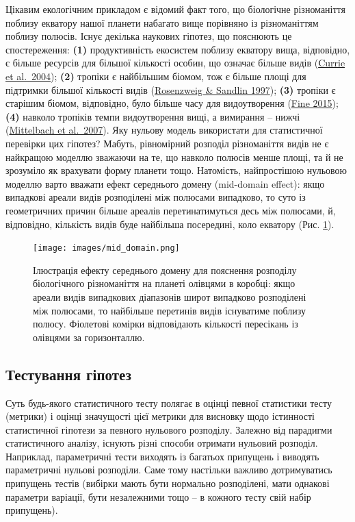 \documentclass[
  11pt,
]{book}
\begin{document}
Цікавим екологічним прикладом є відомий факт того, що біологічне різноманіття поблизу екватору нашої планети набагато вище порівняно із різноманіттям поблизу полюсів. Існує декілька наукових гіпотез, що пояснюють це спостереження: \textbf{(1)} продуктивність екосистем поблизу екватору вища, відповідно, є більше ресурсів для більшої кількості особин, що означає більше видів (\href{https://doi.org/10.1111/j.1461-0248.2004.00671.x}{Currie et al.~2004}); \textbf{(2)} тропіки є найбільшим біомом, тож є більше площі для підтримки більшої кількості видів (\href{https://doi.org/10.2307/3546528}{Rosenzweig \& Sandlin 1997}); \textbf{(3)} тропіки є старішим біомом, відповідно, було більше часу для видоутворення (\href{https://doi.org/10.1146/annurev-ecolsys-112414-054102}{Fine 2015}); \textbf{(4)} навколо тропіків темпи видоутворення вищі, а вимирання -- нижчі (\href{https://doi.org/10.1111/j.1461-0248.2007.01020.x}{Mittelbach et al.~2007}). Яку нульову модель використати для статистичної перевірки цих гіпотез? Мабуть, рівномірний розподіл різноманіття видів не є найкращою моделлю зважаючи на те, що навколо полюсів менше площі, та й не зрозуміло як врахувати форму планети тощо. Натомість, найпростішою нульовою моделлю варто вважати ефект середнього домену (mid-domain effect): якщо випадкові ареали видів розподілені між полюсами випадково, то суто із геометричних причин більше ареалів перетинатимуться десь між полюсами, й, відповідно, кількість видів буде найбільша посередині, коло екватору (Рис. \ref{fig:fig-3-11}).

\begin{figure}
\centering
\texttt{[image: images/mid\_domain.png]}
\caption{\label{fig:fig-3-11}Ілюстрація ефекту середнього домену для пояснення розподілу біологічного різноманіття на планеті олівцями в коробці: якщо ареали видів випадкових діапазонів широт випадково розподілені між полюсами, то найбільше перетинів видів існуватиме поблизу полюсу. Фіолетові комірки відповідають кількості пересікань із олівцями за горизонталлю.}
\end{figure}

\subsection{Тестування гіпотез}\label{pval}

Суть будь-якого статистичного тесту полягає в оцінці певної статистики тесту (метрики) і оцінці значущості цієї метрики для висновку щодо істинності статистичної гіпотези за певного нульового розподілу. Залежно від парадигми статистичного аналізу, існують різні способи отримати нульовий розподіл. Наприклад, параметричні тести виходять із багатьох припущень і виводять параметричні нульові розподіли. Саме тому настільки важливо дотримуватись припущень тестів (вибірки мають бути нормально розподілені, мати однакові параметри варіації, бути незалежними тощо -- в кожного тесту свій набір припущень).
\end{document}
